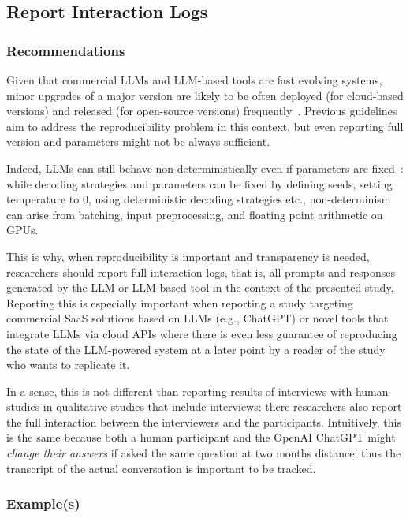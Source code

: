 \documentclass[11pt]{article}
\begin{document}
\subsection{Report Interaction Logs}

\subsubsection{Recommendations}

Given that commercial LLMs and LLM-based tools are fast evolving systems, minor upgrades of a major version are likely to be often deployed (for cloud-based versions) and released (for open-source versions) frequently~\cite{DBLP:journals/corr/abs-2307-09009}. Previous guidelines aim to address the reproducibility problem in this context, but even reporting full version and parameters might not be always sufficient. 

Indeed, LLMs can still behave non-deterministically even if parameters are fixed~\cite{Chann2023}: while decoding strategies and parameters can be fixed by defining seeds, setting temperature to 0, using deterministic decoding strategies etc., non-determinism can arise from batching, input preprocessing, and floating point arithmetic on GPUs. 

This is why, when reproducibility is important and transparency is needed, researchers should report full interaction logs, that is, all prompts and responses generated by the LLM or LLM-based tool in the context of the presented study. 
Reporting this is especially important when reporting a study targeting commercial SaaS solutions based on LLMs (e.g., ChatGPT) or novel tools that integrate LLMs via cloud APIs where there is even less guarantee of reproducing the state of the LLM-powered system at a later point by a reader of the study who wants to replicate it. 

In a sense, this is not different than reporting results of interviews with human studies in qualitative studies that include interviews: there researchers also report the full interaction between the interviewers and the participants. Intuitively, this is the same because both a human participant and the OpenAI ChatGPT might {\em change their answers} if asked the same question at two months distance; thus the transcript of the actual conversation is important to be tracked.


\subsubsection{Example(s)}
\end{document}
